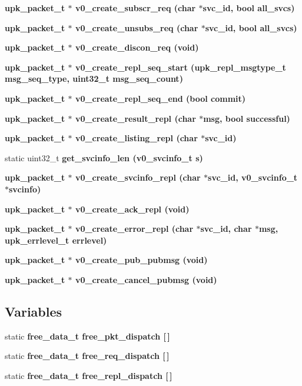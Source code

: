 \begin{CompactItemize}
\item 
\bf{upk\_\-packet\_\-t} $\ast$ \bf{v0\_\-create\_\-subscr\_\-req} (char $\ast$svc\_\-id, bool all\_\-svcs)
\item 
\bf{upk\_\-packet\_\-t} $\ast$ \bf{v0\_\-create\_\-unsubs\_\-req} (char $\ast$svc\_\-id, bool all\_\-svcs)
\item 
\bf{upk\_\-packet\_\-t} $\ast$ \bf{v0\_\-create\_\-discon\_\-req} (void)
\item 
\bf{upk\_\-packet\_\-t} $\ast$ \bf{v0\_\-create\_\-repl\_\-seq\_\-start} (\bf{upk\_\-repl\_\-msgtype\_\-t} msg\_\-seq\_\-type, uint32\_\-t msg\_\-seq\_\-count)
\item 
\bf{upk\_\-packet\_\-t} $\ast$ \bf{v0\_\-create\_\-repl\_\-seq\_\-end} (bool commit)
\item 
\bf{upk\_\-packet\_\-t} $\ast$ \bf{v0\_\-create\_\-result\_\-repl} (char $\ast$msg, bool successful)
\item 
\bf{upk\_\-packet\_\-t} $\ast$ \bf{v0\_\-create\_\-listing\_\-repl} (char $\ast$svc\_\-id)
\item 
static uint32\_\-t \bf{get\_\-svcinfo\_\-len} (\bf{v0\_\-svcinfo\_\-t} s)
\item 
\bf{upk\_\-packet\_\-t} $\ast$ \bf{v0\_\-create\_\-svcinfo\_\-repl} (char $\ast$svc\_\-id, \bf{v0\_\-svcinfo\_\-t} $\ast$svcinfo)
\item 
\bf{upk\_\-packet\_\-t} $\ast$ \bf{v0\_\-create\_\-ack\_\-repl} (void)
\item 
\bf{upk\_\-packet\_\-t} $\ast$ \bf{v0\_\-create\_\-error\_\-repl} (char $\ast$svc\_\-id, char $\ast$msg, \bf{upk\_\-errlevel\_\-t} errlevel)
\item 
\bf{upk\_\-packet\_\-t} $\ast$ \bf{v0\_\-create\_\-pub\_\-pubmsg} (void)
\item 
\bf{upk\_\-packet\_\-t} $\ast$ \bf{v0\_\-create\_\-cancel\_\-pubmsg} (void)
\end{CompactItemize}
\subsection*{Variables}
\begin{CompactItemize}
\item 
static \bf{free\_\-data\_\-t} \bf{free\_\-pkt\_\-dispatch} [$\,$]
\item 
static \bf{free\_\-data\_\-t} \bf{free\_\-req\_\-dispatch} [$\,$]
\item 
static \bf{free\_\-data\_\-t} \bf{free\_\-repl\_\-dispatch} [$\,$]
\end{CompactItemize}


